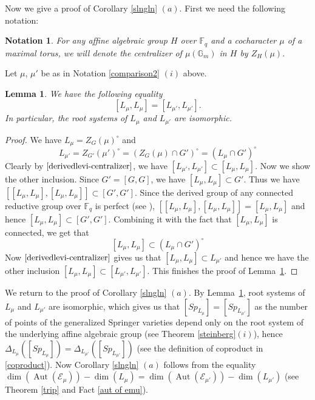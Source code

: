 \documentclass{amsart}
\newcommand{\cE}{\mathcal{E}}
\newcommand{\gm}{\mathbb{G}_{m}}
\theoremstyle{plain}
\newtheorem{lemma}[theorem]{Lemma}
\newtheorem{notation}{Notation}[section]
\theoremstyle{definition}
\theoremstyle{remark}
\DeclareMathOperator{\aut}{Aut}
\begin{document}
Now we give a proof of Corollary \ref{slngln} $(a)$.
First we need the following notation:
\begin{notation}
 For any affine algebraic group $H$ over $\mathbb{F}_{q}$ and a cocharacter $\mu$ of a maximal torus, we will denote the centralizer of $\mu(\gm)$ in $H$ by $Z_{H}(\mu)$.
\end{notation}
Let $\mu$, $\mu'$ be as in Notation \ref{comparison2} $(i)$ above. 
\begin{lemma}\label{derived group of levi}
We have the following equality
\[
[L_{\mu},L_{\mu}]=[L_{\mu'},L_{\mu'}].
\]
In particular, the root systems of $L_{\mu}$ and $L_{\mu'}$ are isomorphic.
\end{lemma}
\begin{proof}
We have $L_{\mu}=Z_{G}(\mu)^{\circ}$ and
\begin{equation}\label{derivedlevi-centralizer}
    L_{\mu'}=Z_{G'}(\mu')^{\circ}=(Z_{G}(\mu)\cap G')^{\circ}=(L_{\mu}\cap G')^{\circ}
\end{equation}
Clearly by $\eqref{derivedlevi-centralizer}$, we have $[L_{\mu'},L_{\mu'}]\subset[L_{\mu},L_{\mu}]$. Now we show the other inclusion. Since $G'=[G,G]$, 
we have 
$[L_{\mu},L_{\mu}]\subset G'$. Thus we have
$
[[L_{\mu},L_{\mu}],[L_{\mu},L_{\mu}]]\subset[G',G']$.
Since the derived group of any connected reductive group over $\mathbb{F}_{q}$ is perfect (see \cite[Proposition 1.2.6]{CGP}), $[[L_{\mu},L_{\mu}],[L_{\mu},L_{\mu}]]=[L_{\mu},L_{\mu}]$ and hence
$
[L_{\mu},L_{\mu}]\subset[G',G'].
$
Combining it with the fact that $[L_\mu,L_\mu]$ is connected, we get that
\[
[L_\mu,L_\mu]\subset(L_\mu\cap G')^{\circ}
\]
Now $\eqref{derivedlevi-centralizer}$ gives us that $[L_\mu,L_\mu]\subset L_{\mu'}$ and hence we have the other inclusion $[L_\mu,L_\mu]\subset [L_{\mu'},L_{\mu'}]$. This finishes the proof of Lemma~\ref{derived group of levi}.
\end{proof}
We return to the proof of Corollary \ref{slngln} $(a)$. By Lemma~\ref{derived group of levi}, root systems of $L_\mu$ and $L_{\mu'}$ are isomorphic, which gives us that $[Sp_{L_{\mu}}]=[Sp_{L_{\mu'}}]$ as the number of points of the generalized Springer varieties depend only on the root system of the underlying affine algebraic group (see Theorem \ref{steinberg}$(i)$), hence $\Delta_{L_{\mu}}([Sp_{L_{\mu}}])=\Delta_{L_{\mu'}}([Sp_{L_{\mu'}}])$ (see the definition of coproduct in \ref{coproduct}). Now Corollary \ref{slngln} $(a)$ follows from the equality $\dim(\aut(\cE_{\mu}))-\dim(L_{\mu})=\dim(\aut(\cE_{\mu'}))-\dim(L_{\mu'})$ (see Theorem \ref{trip} and Fact \ref{aut of emu}).
\end{document}
